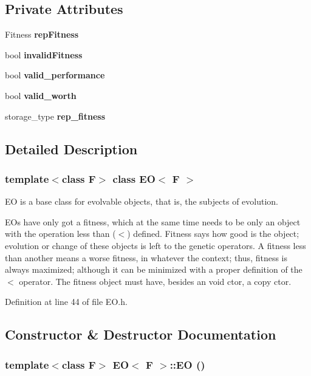 \subsection*{Private Attributes}
\begin{CompactItemize}
\item 
Fitness {\bf rep\-Fitness}\label{class_e_o_r0}

\item 
bool {\bf invalid\-Fitness}\label{class_e_o_r1}

\item 
bool {\bf valid\_\-performance}\label{class_e_o_r2}

\item 
bool {\bf valid\_\-worth}\label{class_e_o_r3}

\item 
storage\_\-type {\bf rep\_\-fitness}\label{class_e_o_r4}

\end{CompactItemize}


\subsection{Detailed Description}
\subsubsection*{template$<$class F$>$ class EO$<$ F $>$}

EO is a base class for evolvable objects, that is, the subjects of evolution. 

EOs have only got a fitness, which at the same time needs to be only an object with the operation less than ($<$) defined. Fitness says how good is the object; evolution or change of these objects is left to the genetic operators. A fitness less than another means a worse fitness, in whatever the context; thus, fitness is always maximized; although it can be minimized with a proper definition of the $<$ operator. The fitness object must have, besides an void ctor, a copy ctor. 



Definition at line 44 of file EO.h.

\subsection{Constructor \& Destructor Documentation}
\subsubsection{\setlength{\rightskip}{0pt plus 5cm}template$<$class F$>$ {\bf EO}$<$ F $>$::{\bf EO} ()\hspace{0.3cm}{\tt  [inline]}}\label{class_e_o_a0}


